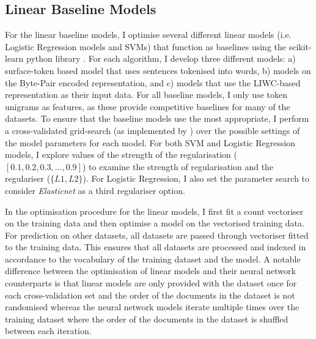 \subsection{Linear Baseline Models}\label{sec:baseline_models}
For the linear baseline models, I optimise several different linear models (i.e. Logistic Regression models and SVMs) that function as baselines using the scikit-learn python library \citet{Pedregosa:2011}.
For each algorithm, I develop three different models: a) surface-token based model that uses sentences tokenised into words, b) models on the Byte-Pair encoded representation, and c) models that use the LIWC-based representation as their input data.
For all baseline models, I only use token unigrams as features, as these provide competitive baselines for many of the datasets.
To ensure that the baseline models use the most appropriate, I perform a cross-validated grid-search (as implemented by \citet{Pedregosa:2011}) over the possible settings of the model parameters for each model.
For both SVM and Logistic Regression models, I explore values of the strength of the regularisation ($[0.1, 0.2, 0.3, \ldots, 0.9]$) to examine the strength of regularisation and the regulariser ($\{L1, L2\}$).
For Logistic Regression, I also set the parameter search to consider \textit{Elasticnet} as a third regulariser option.

In the optimisation procedure for the linear models, I first fit a count vectoriser on the training data and then optimise a model on the vectorised training data.
For prediction on other datasets, all datasets are passed through vectoriser fitted to the training data.
This ensures that all datasets are processed and indexed in accordance to the vocabulary of the training dataset and the model. 
A notable difference between the optimisation of linear models and their neural network counterparts is that linear models are only provided with the dataset once for each cross-validation set and the order of the documents in the dataset is not randomised whereas the neural network models iterate multiple times over the training dataset where the order of the documents in the dataset is shuffled between each iteration.

